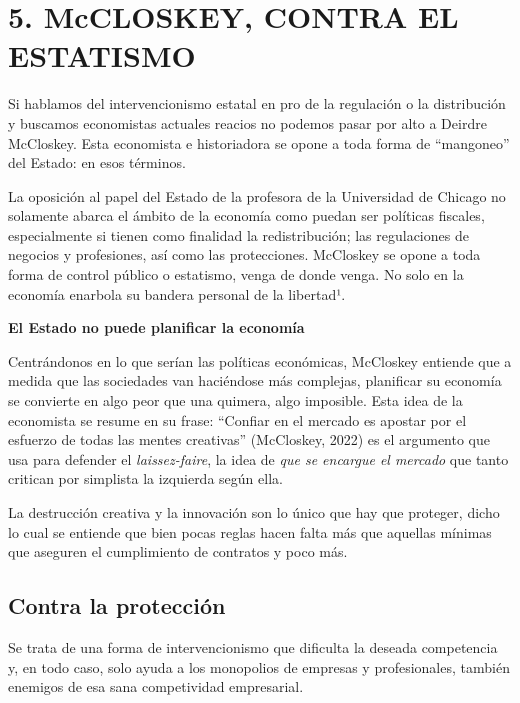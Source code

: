 \documentclass[
]{article}
\begin{document}
\hypertarget{mccloskey-contra-el-estatismo}{%
\section{5. McCLOSKEY, CONTRA EL
ESTATISMO}\label{mccloskey-contra-el-estatismo}}

Si hablamos del intervencionismo estatal en pro de la regulación o la
distribución y buscamos economistas actuales reacios no podemos pasar
por alto a Deirdre McCloskey. Esta economista e historiadora se opone a
toda forma de ``mangoneo'' del Estado: en esos términos.

La oposición al papel del Estado de la profesora de la Universidad de
Chicago no solamente abarca el ámbito de la economía como puedan ser
políticas fiscales, especialmente si tienen como finalidad la
redistribución; las regulaciones de negocios y profesiones, así como las
protecciones. McCloskey se opone a toda forma de control público o
estatismo, venga de donde venga. No solo en la economía enarbola su
bandera personal de la libertad¹.

\textbf{El Estado no puede planificar la economía}

Centrándonos en lo que serían las políticas económicas, McCloskey
entiende que a medida que las sociedades van haciéndose más complejas,
planificar su economía se convierte en algo peor que una quimera, algo
imposible. Esta idea de la economista se resume en su frase: ``Confiar
en el mercado es apostar por el esfuerzo de todas las mentes creativas''
(McCloskey, 2022) es el argumento que usa para defender el
\emph{laissez-faire}, la idea de \emph{que se encargue el mercado} que
tanto critican por simplista la izquierda según ella.

La destrucción creativa y la innovación son lo único que hay que
proteger, dicho lo cual se entiende que bien pocas reglas hacen falta
más que aquellas mínimas que aseguren el cumplimiento de contratos y
poco más.

\hypertarget{contra-la-protecciuxf3n}{%
\subsection{Contra la protección}\label{contra-la-protecciuxf3n}}

Se trata de una forma de intervencionismo que dificulta la deseada
competencia y, en todo caso, solo ayuda a los monopolios de empresas y
profesionales, también enemigos de esa sana competividad empresarial.
\end{document}
